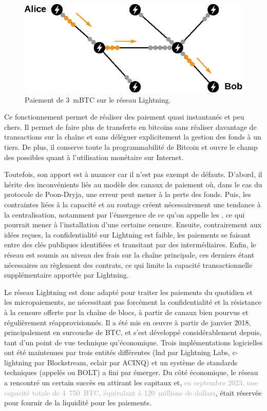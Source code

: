 \begin{figure}[ht]
  \centering
  \includegraphics[scale=1]{img/lightning-network-abacus.eps}
  \caption{Paiement de 3~mBTC sur le réseau Lightning.}
  \label{fig:lightning-network-abacus}
\end{figure}

Ce fonctionnement permet de réaliser des paiement quasi instantanés et peu chers. Il permet de faire plus de transferts en bitcoins sans réaliser davantage de transactions sur la chaîne et sans déléguer explicitement la gestion des fonds à un tiers. De plus, il conserve toute la programmabilité de Bitcoin et ouvre le champ des possibles quant à l'utilisation monétaire sur Internet.

Toutefois, son apport est à nuancer car il n'est pas exempt de défauts. D'abord, il hérite des inconvénients liés au modèle des canaux de paiement où, dans le cas du protocole de Poon-Dryja, une erreur peut mener à la perte des fonds. Puis, les contraintes liées à la capacité et au routage créent nécessairement une tendance à la centralisation, notamment par l'émergence de ce qu'on appelle les , ce qui pourrait mener à l'installation d'une certaine censure. Ensuite, contrairement aux idées reçues, la confidentialité sur Lightning est faible, les paiements se faisant entre des clés publiques identifiées et transitant par des intermédiaires. Enfin, le réseau est soumis au niveau des frais sur la chaîne principale, ces derniers étant nécessaires au règlement des contrats, ce qui limite la capacité transactionnelle supplémentaire apportée par Lightning.

Le réseau Lightning est donc adapté pour traiter les paiements du quotidien et les micropaiements, ne nécessitant pas forcément la confidentialité et la résistance à la censure offerte par la chaîne de blocs, à partir de canaux bien pourvus et régulièrement réapprovisionnés. Il a été mis en œuvre à partir de janvier 2018, principalement en surcouche de BTC, et s'est développé considérablement depuis, tant d'un point de vue technique qu'économique. Trois implémentations logicielles ont été maintenues par trois entités différentes (lnd par Lightning Labs, c-lightning par Blockstream, eclair par ACINQ) et un système de standards techniques (appelés  ou BOLT) a fini par émerger. Du côté économique, le réseau a rencontré un certain succès en attirant les capitaux et, \textcolor{darkgray}{en septembre 2023, une capacité totale de 4~750~BTC, équivalant à 120~millions de dollars}, était réservée pour fournir de la liquidité pour les paiements.

